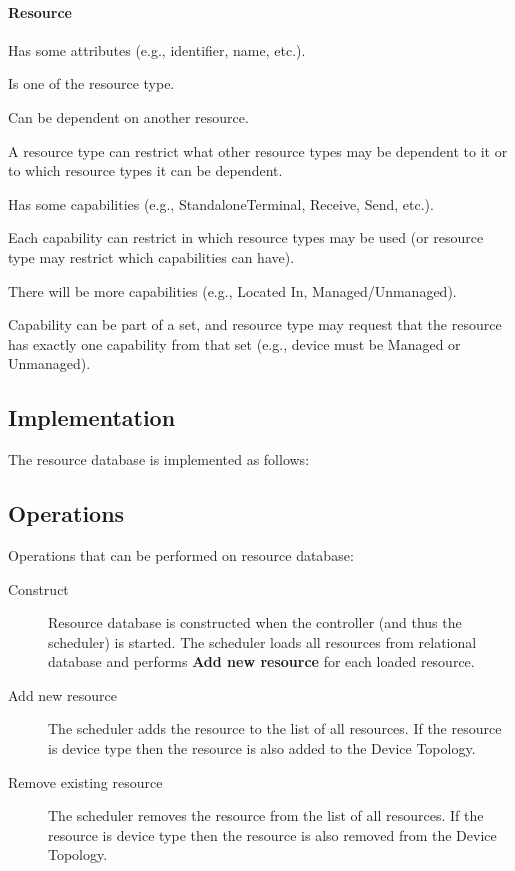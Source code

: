 
\paragraph{Resource}
\begin{compactitem}
\item Has some attributes (e.g., identifier, name, etc.).
\item Is one of the resource type.
\item Can be dependent on another resource. 
\item A resource type can restrict what other resource types may be dependent 
  to it or to which resource types it can be dependent.
\item Has some capabilities (e.g., StandaloneTerminal, Receive, Send, etc.).
\item Each capability can restrict in which resource types may be used (or 
  resource type may restrict which capabilities can have).
\item There will be more capabilities (e.g., Located In, Managed/Unmanaged).
\item Capability can be part of a set, and resource type may request that the 
  resource has exactly one capability from that set (e.g., device must be   
  Managed or Unmanaged). 
\end{compactitem}

\subsection{Implementation}

The resource database is implemented as follows:


\subsection{Operations}

Operations that can be performed on resource database:

\begin{description}
\item[Construct]
Resource database is constructed when the controller (and thus the scheduler) 
is started. The scheduler loads all resources from relational database and 
performs \textbf{Add new resource} for each loaded resource.

\item[Add new resource]
The scheduler adds the resource to the list of all resources. If the resource 
is device type then the resource is also added to the Device Topology.

\item[Remove existing resource]
The scheduler removes the resource from the list of all resources. If the 
resource is device type then the resource is also removed from the Device 
Topology.
\end{description}

